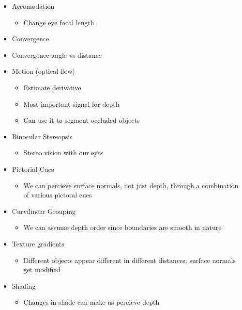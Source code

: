 \documentclass{report}
\begin{document}
\begin{itemize}
    \item Accomodation
    \begin{itemize}
        \item Change eye focal length
    \end{itemize}
    \item Convergence
    \item Convergence angle vs distance
    \item Motion (optical flow)
    \begin{itemize}
        \item Estimate derivative
        \item Most important signal for depth
        \item Can use it to segment occluded objects
    \end{itemize}
    \item Binocular Stereopsis
    \begin{itemize}
        \item Stereo vision with our eyes
    \end{itemize}
    \item Pictorial Cues
    \begin{itemize}
        \item We can percieve surface normals, not just depth, through a combination of various pictoral cues
    \end{itemize}
    \item Curvilinear Grouping
    \begin{itemize}
        \item We can assume depth order since boundaries are smooth in nature
    \end{itemize}
    \item Texture gradients
    \begin{itemize}
        \item Different objects appear different in different distances; surface normals get modified
    \end{itemize}
    \item Shading
    \begin{itemize}
        \item Changes in shade can make us percieve depth
    \end{itemize}
\end{itemize}
\end{document}
